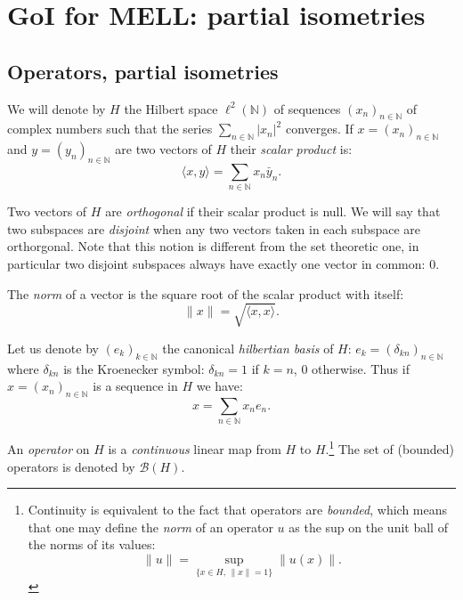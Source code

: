 \section{GoI for MELL: partial isometries}\label{goi-for-mell-partial-isometries}


\subsection{Operators, partial isometries}\label{operators-partial-isometries}

We will denote by \(H\) the Hilbert space \(\ell^2(\mathbb{N})\) of
sequences \((x_n)_{n\in\mathbb{N}}\) of complex numbers such that the
series \(\sum_{n\in\mathbb{N}}|x_n|^2\) converges. If
\(x = (x_n)_{n\in\mathbb{N}}\) and \(y = (y_n)_{n\in\mathbb{N}}\) are
two vectors of \(H\) their \emph{scalar product} is:
\begin{equation*}
\langle x, y\rangle = \sum_{n\in\mathbb{N}} x_n\bar y_n.
\end{equation*}

Two vectors of \(H\) are \emph{orthogonal} if their scalar product is null.
We will say that two subspaces are \emph{disjoint} when any two
vectors taken in each subspace are orthorgonal. Note that this notion is
different from the set theoretic one, in particular two disjoint
subspaces always have exactly one vector in common: \(0\).

The \emph{norm} of a vector is the square root of the scalar product
with itself:
\begin{equation*}
\|x\| = \sqrt{\langle x, x\rangle}.
\end{equation*}

Let us denote by \((e_k)_{k\in\mathbb{N}}\) the canonical
\emph{hilbertian basis} of \(H\):
\(e_k = (\delta_{kn})_{n\in\mathbb{N}}\) where \(\delta_{kn}\) is the
Kroenecker symbol: \(\delta_{kn}=1\) if \(k=n\), \(0\) otherwise. Thus
if \(x=(x_n)_{n\in\mathbb{N}}\) is a sequence in \(H\) we have:
\begin{equation*}
x = \sum_{n\in\mathbb{N}} x_ne_n.
\end{equation*}

An \emph{operator} on \(H\) is a \emph{continuous} linear map from \(H\)
to \(H\).\footnote{Continuity is equivalent to the fact that operators are
\emph{bounded}, which means that one may define the \emph{norm} of an
operator \(u\) as the sup on the unit ball of the norms of its values:
\begin{equation*}
\|u\| = \sup_{\{x\in H,\, \|x\| = 1\}}\|u(x)\|.
\end{equation*}}
The set of (bounded) operators is denoted by \(\mathcal{B}(H)\).

